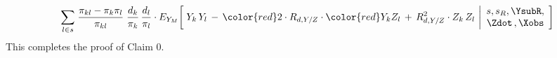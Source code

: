 \begin{enumerate}
\begin{eqnarray*}
        \underset{l \in s}{\sum}\;
        \dfrac{\pi_{kl} - \pi_{k}\pi_{l}}{\pi_{kl}}\;
        \dfrac{d_{k}}{\pi_{k}}\,
        \dfrac{d_{l}}{\pi_{l}}
        \cdot
        E_{Y_{M}}\!\left[\;
            Y_{k}\,Y_{l}
            \, - \,
            {\color{red}2}
            \cdot
            R_{d,Y/Z}
            \cdot
            {\color{red}Y_{k}Z_{l}}
            \, + \,
            R_{d,Y/Z}^{2}
            \cdot
            Z_{k}\,Z_{l}
            \,\left\vert
            \begin{array}{c}
                s,s_{R},\YsubR, \\ \Zdot\,,\Xobs
                \end{array}
            \right.
            \!\right]
    \end{eqnarray*}
    This completes the proof of Claim 0.


\end{enumerate}
